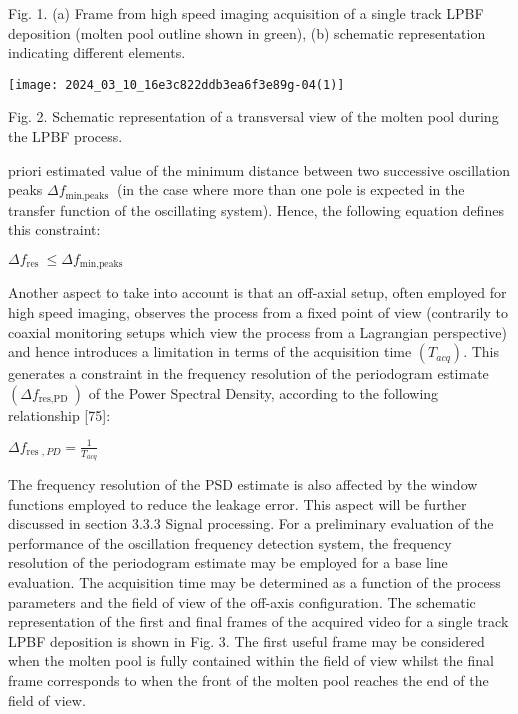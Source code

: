 \documentclass[10pt]{article}
\begin{document}
Fig. 1. (a) Frame from high speed imaging acquisition of a single track LPBF deposition (molten pool outline shown in green), (b) schematic representation indicating different elements.

\begin{center}
\texttt{[image: 2024\_03\_10\_16e3c822ddb3ea6f3e89g-04(1)]}
\end{center}

Fig. 2. Schematic representation of a transversal view of the molten pool during the LPBF process.

priori estimated value of the minimum distance between two successive oscillation peaks $\Delta f_{\text {min,peaks }}$ (in the case where more than one pole is expected in the transfer function of the oscillating system). Hence, the following equation defines this constraint:

$\Delta f_{\text {res }} \leq \Delta f_{\text {min,peaks }}$

Another aspect to take into account is that an off-axial setup, often employed for high speed imaging, observes the process from a fixed point of view (contrarily to coaxial monitoring setups which view the process from a Lagrangian perspective) and hence introduces a limitation in terms of the acquisition time $\left(T_{a c q}\right)$. This generates a constraint in the frequency resolution of the periodogram estimate $\left(\Delta f_{\text {res,PD }}\right)$ of the Power Spectral Density, according to the following relationship [75]:

$\Delta f_{\text {res }, P D}=\frac{1}{T_{a c q}}$

The frequency resolution of the PSD estimate is also affected by the window functions employed to reduce the leakage error. This aspect will be further discussed in section 3.3.3 Signal processing. For a preliminary evaluation of the performance of the oscillation frequency detection system, the frequency resolution of the periodogram estimate may be employed for a base line evaluation. The acquisition time may be determined as a function of the process parameters and the field of view of the off-axis configuration. The schematic representation of the first and final frames of the acquired video for a single track LPBF deposition is shown in Fig. 3. The first useful frame may be considered when the molten pool is fully contained within the field of view whilst the final frame corresponds to when the front of the molten pool reaches the end of the field of view.
\end{document}
